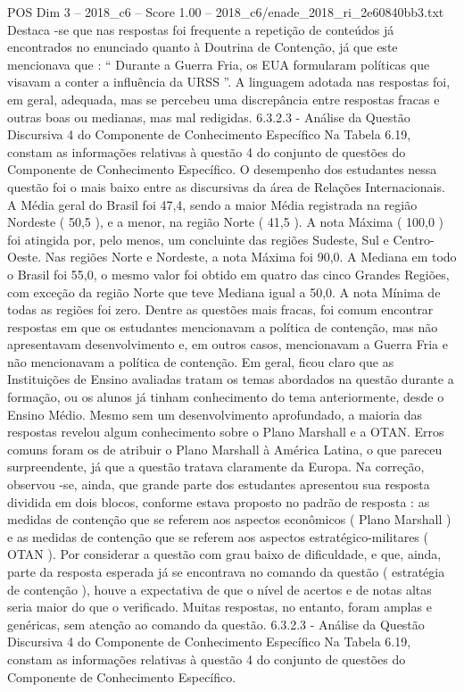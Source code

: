 \begin{textsample}{POS Dim 3 – 2018\_c6 – Score 1.00 – 2018\_c6/enade\_2018\_ri\_2e60840bb3.txt}
Destaca -se que nas respostas foi frequente a repetição de conteúdos já encontrados no enunciado quanto à Doutrina de Contenção, já que este mencionava que : “ Durante a Guerra Fria, os EUA formularam políticas que visavam a conter a influência da URSS ”.
A linguagem adotada nas respostas foi, em geral, adequada, mas se percebeu uma discrepância entre respostas fracas e outras boas ou medianas, mas mal redigidas. 6.3.2.3 - Análise da Questão Discursiva 4 do Componente de Conhecimento Específico Na Tabela 6.19, constam as informações relativas à questão 4 do conjunto de questões do Componente de Conhecimento Específico.
O desempenho dos estudantes nessa questão foi o mais baixo entre as discursivas da área de Relações Internacionais.
A Média geral do Brasil foi 47,4, sendo a maior Média registrada na região Nordeste ( 50,5 ), e a menor, na região Norte ( 41,5 ).
A nota Máxima ( 100,0 ) foi atingida por, pelo menos, um concluinte das regiões Sudeste, Sul e Centro-Oeste.
Nas regiões Norte e Nordeste, a nota Máxima foi 90,0.
A Mediana em todo o Brasil foi 55,0, o mesmo valor foi obtido em quatro das cinco Grandes Regiões, com exceção da região Norte que teve Mediana igual a 50,0.
A nota Mínima de todas as regiões foi zero.
Dentre as questões mais fracas, foi comum encontrar respostas em que os estudantes mencionavam a política de contenção, mas não apresentavam desenvolvimento e, em outros casos, mencionavam a Guerra Fria e não mencionavam a política de contenção.
Em geral, ficou claro que as Instituições de Ensino avaliadas tratam os temas abordados na questão durante a formação, ou os alunos já tinham conhecimento do tema anteriormente, desde o Ensino Médio.
Mesmo sem um desenvolvimento aprofundado, a maioria das respostas revelou algum conhecimento sobre o Plano Marshall e a OTAN.
Erros comuns foram os de atribuir o Plano Marshall à América Latina, o que pareceu surpreendente, já que a questão tratava claramente da Europa.
Na correção, observou -se, ainda, que grande parte dos estudantes apresentou sua resposta dividida em dois blocos, conforme estava proposto no padrão de resposta : as medidas de contenção que se referem aos aspectos econômicos ( Plano Marshall ) e as medidas de contenção que se referem aos aspectos estratégico-militares ( OTAN ).
Por considerar a questão com grau baixo de dificuldade, e que, ainda, parte da resposta esperada já se encontrava no comando da questão ( estratégia de contenção ), houve a expectativa de que o nível de acertos e de notas altas seria maior do que o verificado.
Muitas respostas, no entanto, foram amplas e genéricas, sem atenção ao comando da questão. 6.3.2.3 - Análise da Questão Discursiva 4 do Componente de Conhecimento Específico Na Tabela 6.19, constam as informações relativas à questão 4 do conjunto de questões do Componente de Conhecimento Específico.

\end{textsample}
